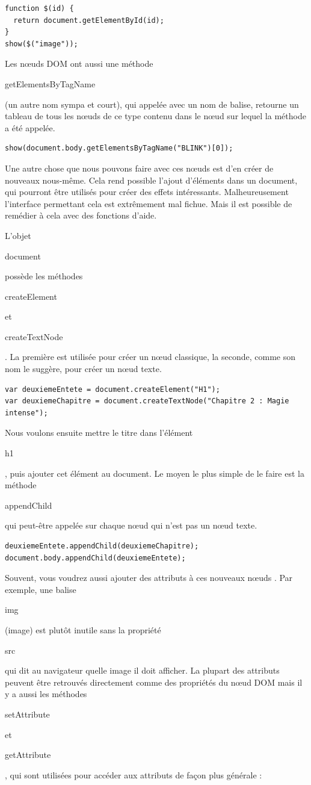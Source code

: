 \documentclass{FramateX}
\renewcommand{\texttt}[1]{\begin{sffamily}{#1}\end{sffamily}}
\begin{document}
\begin{lstlisting}
function $(id) {
  return document.getElementById(id);
}
show($("image"));
\end{lstlisting}
Les nœuds DOM ont aussi une méthode \texttt{getElementsByTagName} (un
autre nom sympa et court), qui appelée avec un nom de balise, retourne
un tableau de tous les nœuds de ce type contenu dans le nœud sur lequel
la méthode a été appelée.

\begin{lstlisting}
show(document.body.getElementsByTagName("BLINK")[0]);
\end{lstlisting}
\begin{center}\end{center}

Une autre chose que nous pouvons faire avec ces nœuds est d'en créer de
nouveaux nous-même. Cela rend possible l'ajout d'éléments dans un
document, qui pourront être utilisés pour créer des effets intéressants.
Malheureusement l'interface permettant cela est extrêmement mal fichue.
Mais il est possible de remédier à cela avec des fonctions d'aide.

L'objet \texttt{document} possède les méthodes \texttt{createElement} et
\texttt{createTextNode}. La première est utilisée pour créer un nœud
classique, la seconde, comme son nom le suggère, pour créer un nœud
texte.

\begin{lstlisting}
var deuxiemeEntete = document.createElement("H1");
var deuxiemeChapitre = document.createTextNode("Chapitre 2 : Magie intense");
\end{lstlisting}
Nous voulons ensuite mettre le titre dans l'élément \texttt{h1}, puis
ajouter cet élément au document. Le moyen le plus simple de le faire est
la méthode \texttt{appendChild} qui peut-être appelée sur chaque nœud
qui n'est pas un nœud texte.

\begin{lstlisting}
deuxiemeEntete.appendChild(deuxiemeChapitre);
document.body.appendChild(deuxiemeEntete);
\end{lstlisting}
Souvent, vous voudrez aussi ajouter des attributs à ces nouveaux nœuds .
Par exemple, une balise \texttt{img} (image) est plutôt inutile sans la
propriété \texttt{src} qui dit au navigateur quelle image il doit
afficher. La plupart des attributs peuvent être retrouvés directement
comme des propriétés du nœud DOM mais il y a aussi les méthodes
\texttt{setAttribute} et \texttt{getAttribute}, qui sont utilisées pour
accéder aux attributs de façon plus générale :
\end{document}
